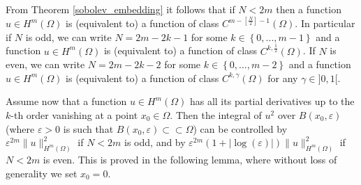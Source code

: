 \documentclass[11pt,a4paper]{amsart}
\numberwithin{equation}{section}
\begin{document}
From Theorem \ref{sobolev_embedding} it follows that if $N<2m$ then  a function $u\in H^m(\Omega)$ is (equivalent to) a function of class $C^{m-\left[\frac{N}{2}\right]-1}(\Omega)$. In particular if $N$ is odd, we can write $N=2m-2k-1$ for some $k\in\left\{0,...,m-1\right\}$ and a function $u\in H^m(\Omega)$ is (equivalent to) a function of class $C^{k,\frac{1}{2}}(\Omega)$. If $N$ is even, we can write $N=2m-2k-2$ for some $k\in\left\{0,...,m-2\right\}$ and a function $u\in H^m(\Omega)$ is (equivalent to) a function of class $C^{k,\gamma}(\Omega)$ for any $\gamma\in]0,1[$.

Assume now that a function $u\in H^{m}(\Omega)$ has all its partial derivatives up to the $k$-th order vanishing at a point $x_0\in\Omega$. Then the integral of $u^2$ over $B(x_0,\varepsilon)$ (where $\varepsilon>0$ is such that $B(x_0,\varepsilon)\subset\subset\Omega$) can be controlled by $\varepsilon^{2m}\|u\|^2_{H^m(\Omega)}$ if $N<2m$ is odd, and by $\varepsilon^{2m}(1+|\log(\varepsilon)|)\|u\|^2_{H^m(\Omega)}$ if $N<2m$ is even. This is proved in the following lemma, where without loss of generality we set $x_0=0$.
\end{document}
